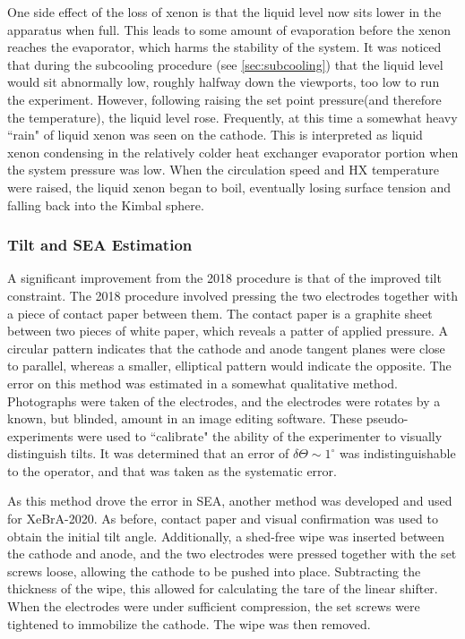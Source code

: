 One side effect of the loss of xenon is that the liquid level now sits lower in the apparatus when full.
This leads to some amount of evaporation before the xenon reaches the evaporator, which harms the stability of the system.
It was noticed that during the subcooling procedure (see \ref{sec:subcooling}) that the liquid level would sit abnormally low, roughly halfway down the viewports, too low to run the experiment.
However, following raising the set point pressure(and therefore the temperature), the liquid level rose. 
Frequently, at this time a somewhat heavy ``rain" of liquid xenon was seen on the cathode.
This is interpreted as liquid xenon condensing in the relatively colder heat exchanger evaporator portion when the system pressure was low.
When the circulation speed and HX temperature were raised, the liquid xenon began to boil, eventually losing surface tension and falling back into the Kimbal sphere.

\subsubsection{Tilt and SEA Estimation}
\label{sec:cathode_tilt}
A significant improvement from the 2018 procedure is that of the improved tilt constraint.
The 2018 procedure involved pressing the two electrodes together with a piece of contact paper between them.
The contact paper is a graphite sheet between two pieces of white paper, which reveals a patter of applied pressure.
A circular pattern indicates that the cathode and anode tangent planes were close to parallel, whereas a smaller, elliptical pattern would indicate the opposite.
The error on this method was estimated in a somewhat qualitative method.
Photographs were taken of the electrodes, and the electrodes were rotates by a known, but blinded, amount in an image editing software.
These pseudo-experiments were used to ``calibrate" the ability of the experimenter to visually distinguish tilts.
It was determined that an error of $\delta \Theta \sim 1^\circ$ was indistinguishable to the operator, and that was taken as the systematic error.

As this method drove the error in SEA, another method was developed and used for XeBrA-2020.
As before, contact paper and visual confirmation was used to obtain the initial tilt angle.
Additionally, a shed-free wipe was inserted between the cathode and anode, and the two electrodes were pressed together with the set screws loose, allowing the cathode to be pushed into place.
Subtracting the thickness of the wipe, this allowed for calculating the tare of the linear shifter.
When the electrodes were under sufficient compression, the set screws were tightened to immobilize the cathode.
The wipe was then removed.

